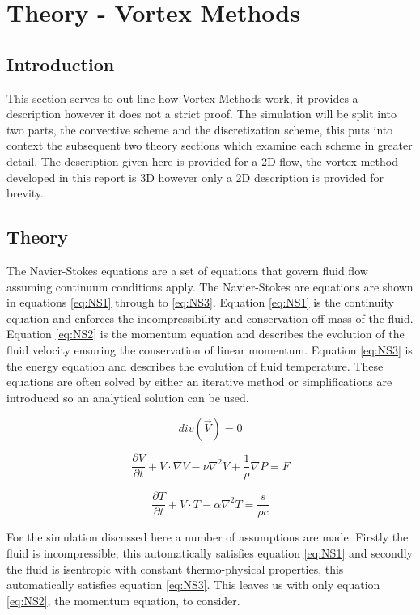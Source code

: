\section{Theory - Vortex Methods}
\subsection{Introduction}
This section serves to out line how Vortex Methods work, it provides a description however it does not a strict proof. The simulation will be split into two parts, the convective scheme and the discretization scheme, this puts into context the subsequent two theory sections which examine each scheme in greater detail. The description given here is provided for a 2D flow, the vortex method developed in this report is 3D however only a 2D description is provided for brevity.
\subsection{Theory}
The Navier-Stokes equations are a set of equations that govern fluid flow assuming continuum conditions apply. The Navier-Stokes are equations are shown in equations \ref{eq:NS1} through to \ref{eq:NS3}. Equation \ref{eq:NS1} is the continuity equation and enforces the incompressibility and conservation off mass of the fluid. Equation \ref{eq:NS2} is the momentum equation and describes the evolution of the fluid velocity ensuring the conservation of linear momentum. Equation \ref{eq:NS3} is the energy equation and describes the evolution of fluid temperature. These equations are often solved by either an iterative method or simplifications are introduced so an analytical solution can be used.

\begin{equation}
\label{eq:NS1}
div(\vec{V})=0
\end{equation}

\begin{equation}
\label{eq:NS2}
\frac{\partial V}{\partial t}+V\cdot\nabla V-\nu\nabla^2 V+\frac{1}{\rho} \nabla P=F
\end{equation}

\begin{equation}
\label{eq:NS3}
\frac{\partial T}{\partial t}+V\cdot T -\alpha \nabla^2 T=\frac{s}{\rho c}
\end{equation}

For the simulation discussed here a number of assumptions are made. Firstly the fluid is incompressible, this automatically satisfies equation \ref{eq:NS1} and secondly the fluid is isentropic with constant thermo-physical properties, this automatically satisfies equation \ref{eq:NS3}. This leaves us with only equation \ref{eq:NS2}, the momentum equation, to consider.

